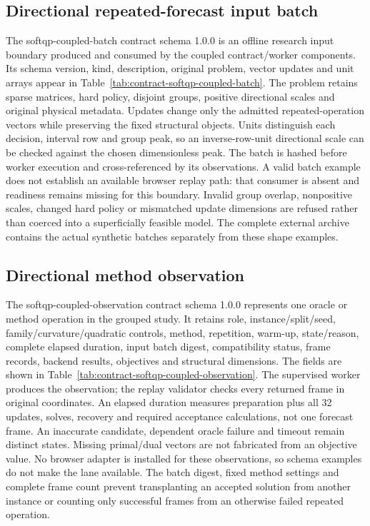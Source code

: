 \subsection{Directional repeated-forecast input batch}\label{sec:contract-softqp-coupled-batch}
The softqp-coupled-batch contract schema 1.0.0 is an offline research input
boundary produced and consumed by the coupled contract/worker components.
Its schema version, kind, description, original problem, vector updates and
unit arrays appear in Table~\ref{tab:contract-softqp-coupled-batch}. The
problem retains sparse matrices, hard policy, disjoint groups, positive
directional scales and original physical metadata. Updates change only
the admitted repeated-operation vectors while preserving the fixed structural
objects. Units distinguish each decision, interval row and group peak, so
an inverse-row-unit directional scale can be checked against the chosen
dimensionless peak. The batch is hashed before worker execution and
cross-referenced by its observations. A valid batch example does not
establish an available browser replay path: that consumer is absent and
readiness remains missing for this boundary. Invalid group overlap,
nonpositive scales, changed hard policy or mismatched update dimensions
are refused rather than coerced into a superficially feasible model. The
complete external archive contains the actual synthetic batches separately
from these shape examples.


\subsection{Directional method observation}\label{sec:contract-softqp-coupled-observation}
The softqp-coupled-observation contract schema 1.0.0 represents one oracle or
method operation in the grouped study. It retains role, instance/split/seed,
family/curvature/quadratic controls, method, repetition, warm-up, state/reason,
complete elapsed duration, input batch digest, compatibility status, frame
records, backend results, objectives and structural dimensions. The fields
are shown in Table~\ref{tab:contract-softqp-coupled-observation}. The supervised
worker produces the observation; the replay validator checks every returned
frame in original coordinates. An elapsed duration measures preparation
plus all 32 updates, solves, recovery and required acceptance calculations,
not one forecast frame. An inaccurate candidate, dependent oracle failure
and timeout remain distinct states. Missing primal/dual vectors are not
fabricated from an objective value. No browser adapter is installed for
these observations, so schema examples do not make the lane available.
The batch digest, fixed method settings and complete frame count prevent
transplanting an accepted solution from another instance or counting only
successful frames from an otherwise failed repeated operation.


